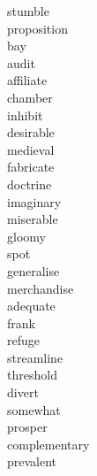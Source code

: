 \documentclass[a4paper, 10pt]{ctexart}
\begin{document}
\begin{multicols*}{2}
\begin{description}
\item[stumble]

\item[proposition]

\item[bay]

\item[audit]

\item[affiliate]

\item[chamber]

\item[inhibit]

\item[desirable]

\item[medieval]

\item[fabricate]

\item[doctrine]

\item[imaginary]

\item[miserable]

\item[gloomy]

\item[spot]

\item[generalise]

\item[merchandise]

\item[adequate]

\item[frank]

\item[refuge]

\item[streamline]

\item[threshold]

\item[divert]

\item[somewhat]

\item[prosper]

\item[complementary]

\item[prevalent]


\end{description}
\end{multicols*}
\end{document}
